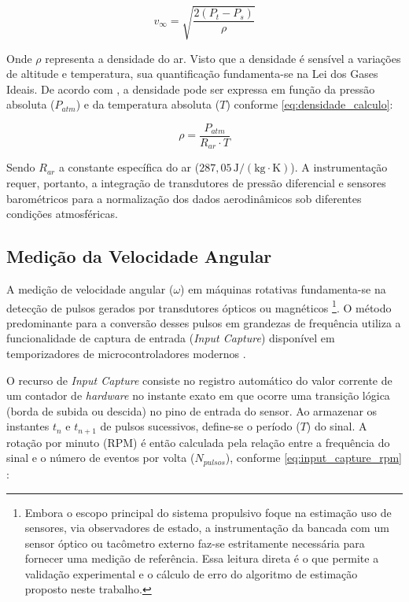 \begin{equation}
    v_\infty = \sqrt{\frac{2(P_t - P_s)}{\rho}}
    \label{eq:bernoulli_v}
\end{equation}

Onde $\rho$ representa a densidade do ar. Visto que a densidade é sensível a variações de altitude e temperatura, sua quantificação fundamenta-se na Lei dos Gases Ideais. De acordo com \cite{Moran2018}, a densidade pode ser expressa em função da pressão absoluta ($P_{atm}$) e da temperatura absoluta ($T$) conforme \eqref{eq:densidade_calculo}:

\begin{equation}
    \rho = \frac{P_{atm}}{R_{ar} \cdot T}
    \label{eq:densidade_calculo}
\end{equation}

Sendo $R_{ar}$ a constante específica do ar ($287,05\,\mathrm{J/(kg \cdot K)}$). A instrumentação requer, portanto, a integração de transdutores de pressão diferencial e sensores barométricos para a normalização dos dados aerodinâmicos sob diferentes condições atmosféricas.

\subsection{Medição da Velocidade Angular}
\label{sec:medicao_rpm}

A medição de velocidade angular ($\omega$) em máquinas rotativas fundamenta-se na detecção de pulsos gerados por transdutores ópticos ou magnéticos \footnote{Embora o escopo principal do sistema propulsivo foque na estimação uso de sensores, via observadores de estado, a instrumentação da bancada com um sensor óptico ou tacômetro externo faz-se estritamente necessária para fornecer uma medição de referência. Essa leitura direta é o que permite a validação experimental e o cálculo de erro do algoritmo de estimação proposto neste trabalho.}. O método predominante para a conversão desses pulsos em grandezas de frequência utiliza a funcionalidade de captura de entrada (\textit{Input Capture}) disponível em temporizadores de microcontroladores modernos \cite{Tocci2017}.



O recurso de \textit{Input Capture} consiste no registro automático do valor corrente de um contador de \textit{hardware} no instante exato em que ocorre uma transição lógica (borda de subida ou descida) no pino de entrada do sensor. Ao armazenar os instantes $t_n$ e $t_{n+1}$ de pulsos sucessivos, define-se o período ($T$) do sinal. A rotação por minuto (RPM) é então calculada pela relação entre a frequência do sinal e o número de eventos por volta ($N_{pulsos}$), conforme \eqref{eq:input_capture_rpm} \cite{Northrup2018}:

